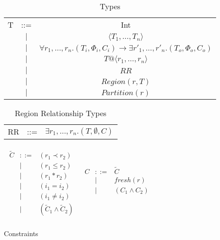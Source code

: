 \documentclass{article}
\newcommand{\rtriple}[3]{\left({#1},{#2},{#3}\right)}
\newcommand{\rtripsub}[3]{\rtriple{#1}{\Phi_{#2}}{C_{#3}}}
\begin{document}
\begin{table*}
\centering
{\small
\begin{tabular}{ccc}

T & ::= & Int \\
  &$\mid$&$\langle T_1, \ldots, T_n \rangle$ \\
  &$\mid$&$\forall r_1, \ldots, r_n. \rtripsub{T_i}{i}{i} \rightarrow \exists r'_1, \ldots, r'_n.\rtripsub{T_o}{o}{o}$ \\
  &$\mid$&$T@\langle r_1, \ldots, r_n \rangle$\\
  &$\mid$&$RR$ \\
  &$\mid$&$Region(r,T)$ \\
  &$\mid$&$Partition(r)$ \\

\end{tabular}
}
\caption{Types}
\end{table*}

\begin{table*}
\centering
{\small
\begin{tabular}{ccc}
RR & ::= & $\exists r_1, \ldots, r_n.\rtriple{T}{\emptyset}{C}$ \\
\end{tabular}
}
\caption{Region Relationship Types}
\end{table*}



\begin{table*}
\centering
{\small
\begin{math}
\begin{array}{cc}
\begin{array}{ccc}
\widetilde{C} & ::= & (r_1 \prec r_2) \\
  &\mid&(r_1 \le r_2) \\
  &\mid&(r_1 * r_2) \\
  &\mid&(i_1 = i_2) \\
  &\mid&(i_1 \ne i_2) \\
  &\mid&(\widetilde{C}_1 \wedge \widetilde{C}_2) \\
\end{array} &
\begin{array}{ccc}
C & ::= & \widetilde{C} \\
  &\mid&fresh(r) \\
  &\mid&(C_1 \wedge C_2) \\ { } \\ { } \\
\end{array}
\end{array}
\end{math}
}
\caption{Constraints}
\end{table*}
\end{document}

